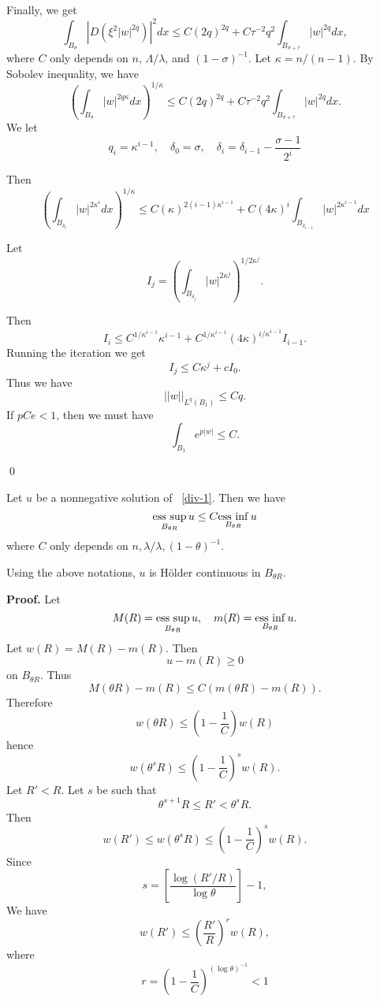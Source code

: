 Finally, we get
\[
\int_{B_\sigma}|D(\xi^2|w|^{2q})|^2 dx\leq C(2q)^{2q}+C\tau^{-2}q^2\int_{B_{\sigma+\tau}}|w|^{2q} dx,
\]
where $C$ only depends on $n$, $\Lambda/\lambda$, and $(1-\sigma)^{-1}$. Let $\kappa=n/(n-1)$. By Sobolev inequality, we have
\[
\left(\int_{B_\sigma}|w|^{2q\kappa} dx\right)^{1/\kappa}\leq C(2q)^{2q}+C\tau^{-2}q^2\int_{B_{\sigma+\tau}}|w|^{2q} dx.
\]
We let 
\[
q_i=\kappa^{i-1},\quad\delta_0=\sigma,\quad \delta_i=\delta_{i-1}-\frac{\sigma-1}{2^i}
\]

Then
\[
\left(\int_{B_{\delta_i}}|w|^{2\kappa^i} dx\right)^{1/\kappa}
\leq C(\kappa)^{2(i-1)\kappa^{i-1}}+C(4\kappa)^i\int_{B_{\delta_{i-1}}}|w|^{2\kappa^{i-1}}dx
\]

Let
\[
I_j=\left(\int_{B_{\delta_j}}|w|^{2\kappa^j}\right)^{1/2\kappa^j}.
\]

Then
\[
I_i\leq C^{1/\kappa^{i-1}}\kappa^{i-1}+C^{1/\kappa^{i-1}}(4\kappa)^{i/\kappa^{i-1}}I_{i-1}.
\]
Running the iteration we get
\[
I_j\leq C\kappa^j+cI_0.
\]
Thus we have 
\[
||w||_{L^q(B_1)}\leq Cq.
\]
If $pCe<1$, then we must have
\[
\int_{B_1}e^{p|w|}\leq C.
\]

\qed



\begin{theorem} Let $u$ be a nonnegative solution of ~\eqref{div-1}. Then we have
\[
\underset{B_{\theta R}}{{\rm ess}\,\sup}\,u\leq C \underset{B_{\theta R}}{{\rm ess}\,\inf}\,u
\]
where $C$ only depends on $n, \lambda/\lambda, (1-\theta)^{-1}$.
\end{theorem}


\begin{theorem}  Using the above notations, $u$ is H\"older continuous in $B_{\theta R}$.
\end{theorem}

{\bf Proof.}
Let
\[
M(R)=\underset{B_{\theta R}}{{\rm ess}\,\sup}\,u,\quad m(R)=\underset{B_{\theta R}}{{\rm ess}\,\inf}\,u.
\]
Let $w(R)=M(R)-m(R)$. Then
\[
u-m(R)\geq 0
\]
on $B_{\theta R}$. Thus
\[
M(\theta R)-m(R)\leq C(m(\theta R)-m(R)).
\]
Therefore
\[
w(\theta R)\leq \left(1-\frac 1C\right)w(R)
\]
hence
\[
w(\theta^s R)\leq \left(1-\frac 1C\right)^sw(R).
\]
Let $R'<R$. Let $s$ be such that 
\[
\theta^{s+1}R\leq R'<\theta^s R.
\]
Then
\[
w(R')\leq w(\theta^sR)\leq \left(1-\frac 1C\right)^sw(R).
\]
Since 
\[
s=\left[\frac{\log (R'/R)}{\log\theta}\right]-1,
\]
We have
\[
w(R')\leq\left(\frac{R'}{R}\right)^rw(R),
\]
where 
\[
r=\left(1-\frac 1C\right)^{(\log\theta)^{-1}}<1
\]

